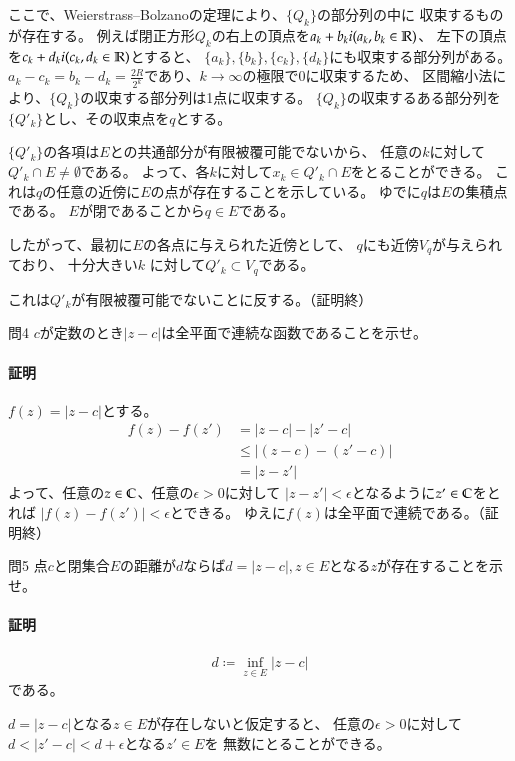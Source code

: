 ここで、Weierstrass--Bolzanoの定理により、$\{Q_k\}$の部分列の中に
収束するものが存在する。
例えば閉正方形$Q_k$の右上の頂点を$a_k+b_{k}i (a_k,b_k\in\mathbb{R})$、
左下の頂点を$c_k+d_{k}i (c_k,d_k\in\mathbb{R})$とすると、
$\{a_k\}, \{b_k\},\{c_k\},\{d_k\}$にも収束する部分列がある。
$a_k-c_k=b_k-d_k=\frac{2R}{2^k}$であり、$k\longrightarrow\infty$の極限で0に収束するため、
区間縮小法により、$\{Q_k\}$の収束する部分列は1点に収束する。
$\{Q_k\}$の収束するある部分列を$\{Q'_k\}$とし、その収束点を$q$とする。

$\{Q'_k\}$の各項は$E$との共通部分が有限被覆可能でないから、
任意の$k$に対して$Q'_k\cap E\neq\emptyset$である。
よって、各$k$に対して$x_k\in Q'_k\cap E$をとることができる。
これは$q$の任意の近傍に$E$の点が存在することを示している。
ゆでに$q$は$E$の集積点である。
$E$が閉であることから$q\in E$である。

したがって、最初に$E$の各点に与えられた近傍として、
$q$にも近傍$V_q$が与えられており、
十分大きい$k$ に対して$Q'_k\subset V_q$である。

これは$Q'_k$が有限被覆可能でないことに反する。（証明終）

\begin{mysimplebox}{問4}
    $c$が定数のとき$|z-c|$は全平面で連続な函数であることを示せ。
\end{mysimplebox}
\paragraph{証明}
$f(z)=|z-c|$とする。
\begin{align*}
    f(z)-f(z')&=|z-c|-|z'-c|\\
    &\le |(z-c)-(z'-c)|\\
    &=|z-z'|
\end{align*}
よって、任意の$z\in\mathbb{C}$、任意の$\epsilon>0$に対して
$|z-z'|<\epsilon$となるように$z'\in\mathbb{C}$をとれば
$|f(z)-f(z')|<\epsilon$とできる。
ゆえに$f(z)$は全平面で連続である。（証明終）

\begin{mysimplebox}{問5}
    点$c$と閉集合$E$の距離が$d$ならば$d=|z-c|, z\in E$となる$z$が存在することを示せ。
\end{mysimplebox}
\paragraph{証明}
\begin{align*}
    d\coloneqq \inf_{z\in E}|z-c|
\end{align*}
である。

$d=|z-c|$となる$z\in E$が存在しないと仮定すると、
任意の$\epsilon>0$に対して$d<|z'-c|<d+\epsilon$となる$z'\in E$を
無数にとることができる。


